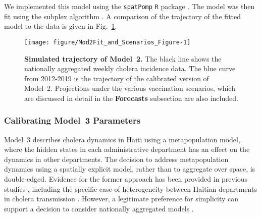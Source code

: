\documentclass[10pt,letterpaper]{article}\usepackage[]{graphicx}\usepackage[table]{xcolor}
\makeatletter
\def\maxwidth{ %
  \ifdim\Gin@nat@width>\linewidth
    \linewidth
  \else
    \Gin@nat@width
  \fi
}
\newenvironment{knitrout}{}{} %
\newcommand\code[1]{\texttt{#1}}
\newcommand\figTitle{\bf}
\makeatother
\begin{document}
We implemented this model using the \code{spatPomp} \code{R} package \cite{asfaw23arxiv}.
The model was then fit using the subplex algorithm \old{, implemented in the  \code{subplex} package} \cite{king2020Subplex}.
A comparison of the trajectory of the fitted model to the data is given in Fig.~\ref{fig:mod2Traj}.





\begin{figure}[!h]
\begin{knitrout}
\color{fgcolor}

{\centering \texttt{[image: figure/Mod2Fit\_and\_Scenarios\_Figure-1]} 

}


\end{knitrout}
\caption{\label{fig:mod2Traj}
{\figTitle Simulated trajectory of Model~2.}
The black line shows the nationally aggregated weekly cholera incidence data.
The blue curve from 2012-2019 is the trajectory of the calibrated version of Model~2.
Projections under the various vaccination scenarios, which are discussed in detail in the  {\bf Forecasts} subsection are also included. }
\end{figure}

\subsubsection*{Calibrating Model~3 Parameters}\label{sec:fit3}
Model~3 describes cholera dynamics in Haiti using a metapopulation model, where the hidden states in each administrative department has an effect on the dynamics in other departments.
The decision to address metapopulation dynamics using a spatially explicit model, rather than to aggregate over space, is double-edged.
Evidence for the former approach has been provided in previous studies \cite{king15}, including the specific case of heterogeneity between Haitian departments in cholera transmission \cite{collins14}.
However, a legitimate preference for simplicity can support a decision to consider nationally aggregated models \cite{saltelli20,green15}.

\new{\editMetaPop}
\end{document}

